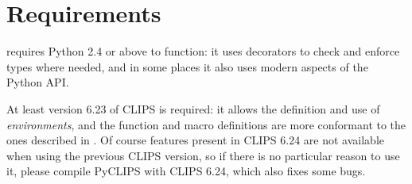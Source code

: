 \section{Requirements\label{pyclips-setup-requirements}}

\pyclips{} requires Python 2.4 or above to function: it uses decorators
to check and enforce types where needed, and in some places it also uses
modern aspects of the Python API.

At least version 6.23 of CLIPS is required: it allows the definition and
use of \emph{environments}, and the function and macro definitions are
more conformant to the ones described in \clipsapg{}. Of course features
present in CLIPS 6.24 are not available when using the previous CLIPS
version, so if there is no particular reason to use it, please compile
PyCLIPS with CLIPS 6.24, which also fixes some bugs.

